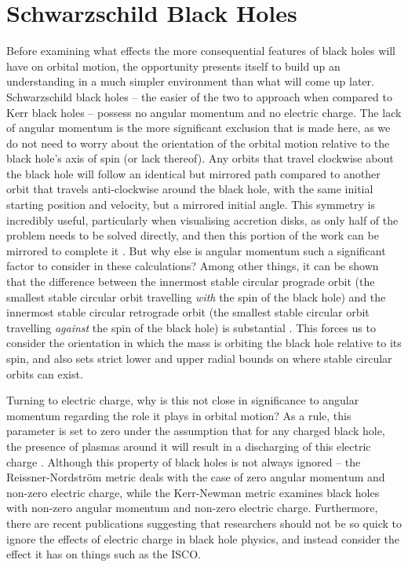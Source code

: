 \section{Schwarzschild Black Holes}
Before examining what effects the more consequential features of black holes will have on orbital motion, the opportunity presents itself to build up an understanding in a much simpler environment than what will come up later.
Schwarzschild black holes -- the easier of the two to approach when compared to Kerr black holes -- possess no angular momentum and no electric charge.
The lack of angular momentum is the more significant exclusion that is made here, as we do not need to worry about the orientation of the orbital motion relative to the black hole's axis of spin (or lack thereof).
Any orbits that travel clockwise about the black hole will follow an identical but mirrored path compared to another orbit that travels anti-clockwise around the black hole, with the same initial starting position and velocity, but a mirrored initial angle.
This symmetry is incredibly useful, particularly when visualising accretion disks, as only half of the problem needs to be solved directly, and then this portion of the work can be mirrored to complete it \cite{schwarzSymmetry}.
But why else is angular momentum such a significant factor to consider in these calculations?
Among other things, it can be shown that the difference between the innermost stable circular prograde orbit (the smallest stable circular orbit travelling \textit{with} the spin of the black hole) and the innermost stable circular retrograde orbit (the smallest stable circular orbit travelling \textit{against} the spin of the black hole) is substantial \cite{ISCOproret}.
This forces us to consider the orientation in which the mass is orbiting the black hole relative to its spin, and also sets strict lower and upper radial bounds on where stable circular orbits can exist. 

Turning to electric charge, why is this not close in significance to angular momentum regarding the role it plays in orbital motion?
As a rule, this parameter is set to zero under the assumption that for any charged black hole, the presence of plasmas around it will result in a discharging of this electric charge \cite{electricNegligence}.
Although this property of black holes is not always ignored -- the Reissner-Nordstr{\"o}m metric deals with the case of zero angular momentum and non-zero electric charge, while the Kerr-Newman metric examines black holes with non-zero angular momentum and non-zero electric charge.
Furthermore, there are recent publications suggesting that researchers should not be so quick to ignore the effects of electric charge in black hole physics, and instead consider the effect it has on things such as the ISCO. \cite{electricNegligence}

